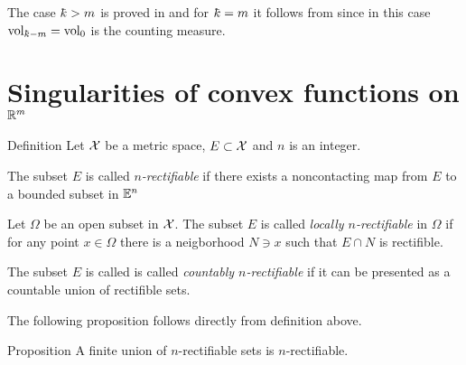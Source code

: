 The case $\kay>m$ is proved in \cite[3.2.11]{federer}
and for $\kay=m$ it follows from \cite[3.2.3]{federer} since in this case 
$\vol_{\kay-m}=\vol_0$ is the counting measure.
















\section{Singularities of convex functions on $\mathbb{R}^m$}%
\label{sec:sing-of-conv}

\begin{thm}{Definition}
 Let $\mathcal{X}$ be a metric space,
$E\subset \spc{X}$ and $n$ is an integer.
\begin{subthm}{}
The subset $E$ is called 
\emph{$n$-rectifiable}
if  there exists a noncontacting map from $E$ to a bounded subset in $\mathbb{E}^n$
\end{subthm}

\begin{subthm}{}
Let $\Omega$ be an open subset in $\mathcal{X}$.
The subset $E$ is called 
\emph{locally $n$-rectifiable}
in $\Omega$
 if for any point $x\in \Omega$ there is a neigborhood $N\ni x$ such that $E\cap N$ is rectifible.
\end{subthm}

\begin{subthm}{}
The subset $E$ is called is called \emph{countably $n$-rectifiable} 
if it can be presented as a countable union of rectifible sets.
\end{subthm}

\end{thm}

The following proposition follows directly from definition above.

\begin{thm}{Proposition}\label{prop:finite-union-is-rectifiable}
A finite union of $n$-rectifiable sets is $n$-rectifiable.
\end{thm}



